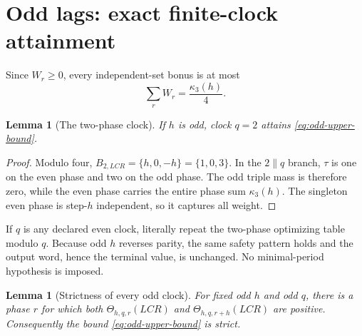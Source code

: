 \documentclass[11pt]{article}
\newtheorem{lemma}[theorem]{Lemma}
\theoremstyle{definition}
\theoremstyle{remark}
\begin{document}
\section{Odd lags: exact finite-clock attainment}

Since \(W_r\geq0\), every independent-set bonus is at most
\begin{equation}
 \sum_rW_r=\frac{\kappa_3(h)}4.
 \label{eq:odd-upper-bound}
\end{equation}

\begin{lemma}[The two-phase clock]
\label{lem:q-two-attainment}
If \(h\) is odd, clock \(q=2\) attains \eqref{eq:odd-upper-bound}.
\end{lemma}

\begin{proof}
Modulo four,
\(B_{2,LCR}=\{h,0,-h\}=\{1,0,3\}\).  In the \(2\parallel q\) branch,
\(\tau\) is one on the even phase and two on the odd phase.  The odd
triple mass is therefore zero, while the even phase carries the entire
phase sum \(\kappa_3(h)\).  The singleton even phase is step-\(h\)
independent, so it captures all weight.
\end{proof}

If \(q\) is any declared even clock, literally repeat the two-phase
optimizing table modulo \(q\).  Because odd \(h\) reverses parity, the same
safety pattern holds and the output word, hence the terminal value, is
unchanged.  No minimal-period hypothesis is imposed.

\begin{lemma}[Strictness of every odd clock]
\label{lem:odd-clock-strictness}
For fixed odd \(h\) and odd \(q\), there is a phase \(r\) for which both
\(\Theta_{h,q,r}(LCR)\) and \(\Theta_{h,q,r+h}(LCR)\) are positive.
Consequently the bound \eqref{eq:odd-upper-bound} is strict.
\end{lemma}
\end{document}
